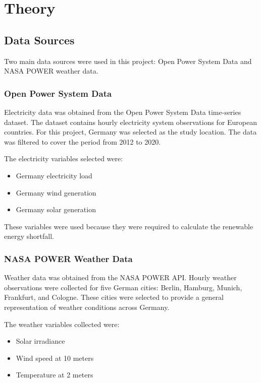 \documentclass[conference]{IEEEtran}
\begin{document}
\section{Theory}
\subsection{Data Sources}

Two main data sources were used in this project: Open Power System Data and NASA POWER weather data.

\subsubsection{Open Power System Data}

Electricity data was obtained from the Open Power System Data time-series dataset. The dataset contains hourly electricity system observations for European countries. For this project, Germany was selected as the study location. The data was filtered to cover the period from 2012 to 2020.

The electricity variables selected were:

\begin{itemize}
    \item Germany electricity load
    \item Germany wind generation
    \item Germany solar generation
\end{itemize}

These variables were used because they were required to calculate the renewable energy shortfall.

\subsubsection{NASA POWER Weather Data}

Weather data was obtained from the NASA POWER API. Hourly weather observations were collected for five German cities: Berlin, Hamburg, Munich, Frankfurt, and Cologne. These cities were selected to provide a general representation of weather conditions across Germany.

The weather variables collected were:

\begin{itemize}
    \item Solar irradiance
    \item Wind speed at 10 meters
    \item Temperature at 2 meters
\end{itemize}
\end{document}
